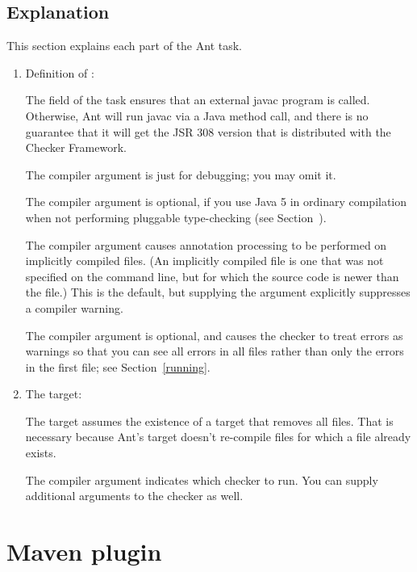 \subsection{Explanation\label{ant-task-explanation}}

This section explains each part of the Ant task.

\begin{enumerate}
\item Definition of :

The  field of the  task
ensures that an external javac program is called.  Otherwise, Ant will run
javac via a Java method call, and there is no guarantee that it will get
the JSR 308 version that is distributed with the Checker Framework.

The  compiler argument is just for debugging; you may omit
it.

The  compiler argument is optional, if you use Java 5 in
ordinary compilation when not performing pluggable type-checking (see
Section~).

The  compiler argument causes annotation processing
to be performed on implicitly compiled files.  (An implicitly compiled file
is one that was not specified on the command line, but for which the source
code is newer than the  file.)  This is the default, but
supplying the argument explicitly suppresses a compiler warning.

The  compiler argument is optional, and causes the checker to
treat errors as warnings so that you can see all errors in all files rather
than only the errors in the first file; see Section~\ref{running}.

\item The  target:

The target assumes the existence of a  target that removes all
 files.  That is necessary because Ant's  target
doesn't re-compile  files for which a  file
already exists.

The  compiler argument indicates which checker to
run.  You can supply additional arguments to the checker as well.

\end{enumerate}


\section{Maven plugin\label{maven-plugin}}

